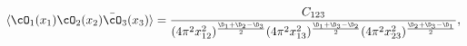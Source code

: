 \begin{equation} \label{3pt}
\langle \cO_{1}(x_1) \cO_{2}(x_2) \bar\cO_{3}(x_3) \rangle  =
\frac{C_{123} }
{(4\pi^2 x_{12}^2)^{\frac{\D_1+\D_2 -\D_3}{2}}
 (4\pi^2 x_{13}^2)^{\frac{\D_1+\D_3 -\D_2}{2}}
 (4\pi^2 x_{23}^2)^{\frac{\D_2+\D_3 -\D_1}{2}}},
\end{equation}

